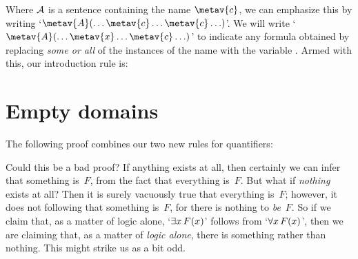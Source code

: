 Where $\mathcal{A}$ is a sentence containing the name $\metav{c}$, we can emphasize this by writing `$\metav{A}(\ldots \metav{c} \ldots \metav{c}\ldots)$'. We will write `$\metav{A}(\ldots \metav{x} \ldots \metav{c}\ldots)$' to indicate any formula obtained by replacing \emph{some or all} of the instances of the name  with the variable . Armed with this, our introduction rule is:

\section{Empty domains}
The following proof combines our two new rules for quantifiers:
	\begin{fitchproof}
		\PR
	\end{fitchproof}
Could this be a bad proof? If anything exists at all, then certainly we can infer that something is~$F$, from the fact that everything is~$F$. But what if \emph{nothing} exists at all? Then it is surely vacuously true that everything is~$F$; however, it does not following that something is~$F$, for there is nothing to \emph{be}~$F$. So if we claim that, as a matter of logic alone, `$\exists x\,\mathord{F}(x)$' follows from `$\forall x\,\mathord{F}(x)$', then we are claiming that, as a matter of \emph{logic alone}, there is something rather than nothing. This might strike us as a bit odd.

